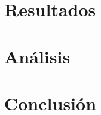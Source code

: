 \documentclass[]{article}
\begin{document}
\section{Resultados}



\section{Análisis}


\section{Conclusión}
\end{document}
